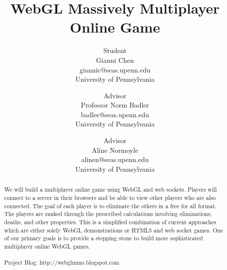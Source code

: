 \documentclass{acmsiggraph}
\title{WebGL Massively Multiplayer Online Game}
\author{Student\\ Gianni Chen\\ giannic@seas.upenn.edu\\ University of Pennsylvania
\and Advisor\\ Professor Norm Badler\\ badler@seas.upenn.edu\\ University of Pennsylvania
\and Advisor\\ Aline Normoyle\\ alinen@seas.upenn.edu\\ University of Pennsylvania}
\begin{document}

\maketitle

\begin{abstract}
\begin{itshape}
We will build a multiplayer online game using WebGL and web sockets. Players will connect to a server in their browsers and be able to view other players who are also connected. The goal of each player is to eliminate the others in a free for all format. The players are ranked through the prescribed calculations involving eliminations, deaths, and other properties. This is a simplified combination of current approaches which are either solely WebGL demonstrations or HTML5 and web socket games. One of our primary goals is to provide a stepping stone to build more sophisticated multiplayer online WebGL games.
\\\\
Project Blog: http://webglmmo.blogspot.com
\end{itshape}
\end{abstract}
\end{document}

